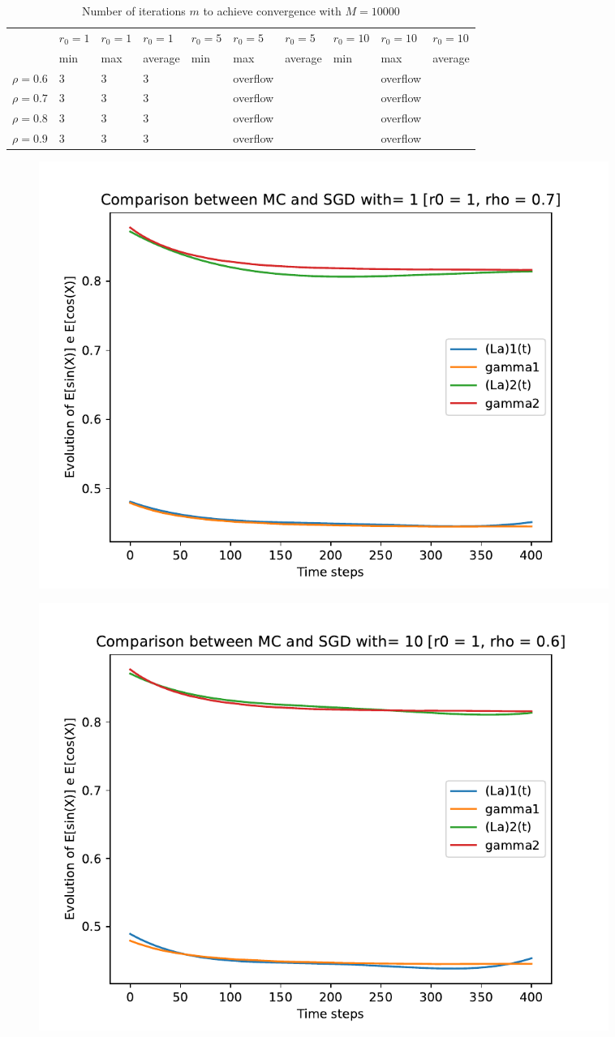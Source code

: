 \documentclass[a4paper,11pt,openright]{report}
\begin{document}
\begin{table}[H]
\centering
\addtolength{\leftskip}{-1.5cm}
\addtolength{\rightskip}{-1.5cm}
\begin{tabular}{|c|lllllllll|}
\hline
$ $ & $r_0 = 1$ & $r_0 = 1$ & $r_0 = 1$ & $r_0 = 5$ & $r_0 = 5$ & $r_0 = 5$ & $r_0 = 10$ & $r_0 = 10$ & $r_0 = 10$  \\
$ $ & min & max & average & min & max & average & min & max & average \\ 
\hline
$\rho = 0.6$ & 3 & 3 & 3 &  & overflow & &  & overflow &  \\

$\rho = 0.7$ & 3 & 3 & 3 &  & overflow & &  & overflow &  \\

$\rho = 0.8$ & 3 & 3 & 3 &  & overflow & &  & overflow &  \\

$\rho = 0.9$ & 3 & 3 & 3 &  & overflow & &  & overflow &  \\
\hline
\end{tabular}
\caption{Number of iterations $m$ to achieve convergence with $M = 10000$}
\end{table}
\begin{figure}[H]
\centering
\includegraphics[width=0.9\textwidth]{images/graphics T = 4/n = 4, M = 1 sine and cosine.pdf}
\end{figure}
\begin{figure}[H]
\centering
\includegraphics[width=0.9\textwidth]{images/graphics T = 4/n = 4, M = 10 sine and cosine.pdf}
\end{figure}
\end{document}
